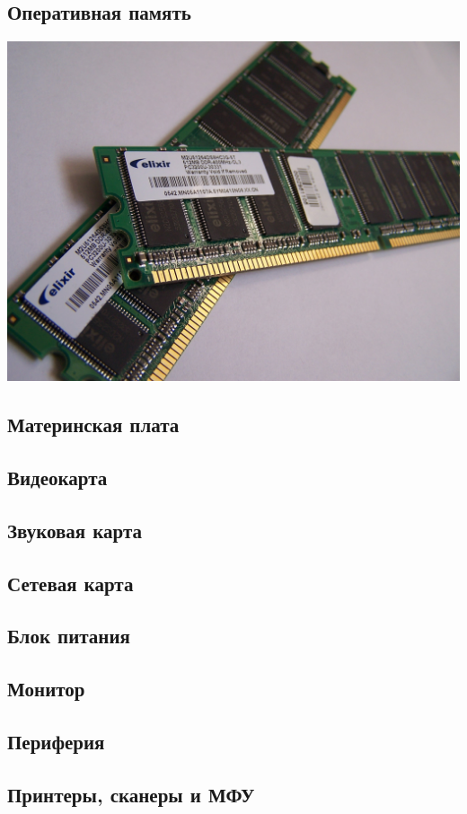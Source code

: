 \subsection{Оперативная память}\label{base:introduction:components:ram}
\includegraphics[scale=1]{base/Introduction/Memory.jpg}
\subsection{Материнская плата}\label{base:introduction:components:motherboard}
\subsection{Видеокарта}\label{base:introduction:components:videocard}
\subsection{Звуковая карта}\label{base:introduction:components:soundcard}
\subsection{Сетевая карта}\label{base:introduction:components:nic}
\subsection{Блок питания}\label{base:introduction:components:psu}
\subsection{Монитор}\label{base:introduction:components:monitor}
\subsection{Периферия}\label{base:introduction:components:peripheral}
\subsection{Принтеры, сканеры и МФУ}\label{base:introduction:components:printers}
